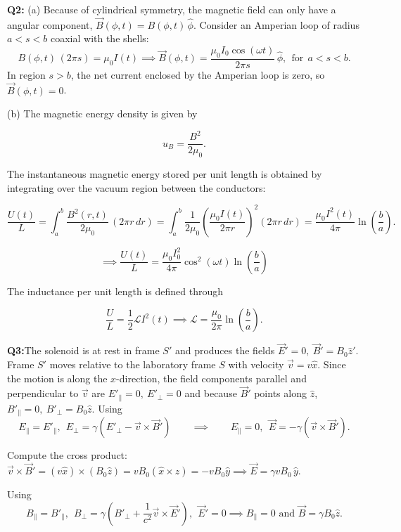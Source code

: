 \documentclass[a4paper,12pt]{article}
\begin{document}
\textbf{Q2:} (a) Because of cylindrical symmetry, the magnetic field can only have a angular component, $\vec B(\phi,t)=B(\phi,t)\,\hat \phi$. Consider an Amperian loop of radius \(a<s<b\) coaxial with the shells:
\[
B(\phi,t)\,(2\pi s)
=
\mu_0 I(t) \implies \boxed{\vec B(\phi,t)
=
\frac{\mu_0 I_0 \cos(\omega t)}{2\pi s}\,\hat \phi,
~~\text{for}~~a<s<b.
}
\]
In region \(s>b\), the net current enclosed by the Amperian loop is zero, so \(\vec B(\phi,t)=0\).

(b) The magnetic energy density is given by

\[
u_B=\frac{B^2}{2\mu_0}.
\]

The instantaneous magnetic energy stored per unit length is obtained by integrating over the vacuum region between the conductors:

\[
\frac{U(t)}{L}
=
\int_a^b
\frac{B^2(r,t)}{2\mu_0}\,(2\pi r\,dr)=\int_a^b
\frac{1}{2\mu_0}
\left(
\frac{\mu_0 I(t)}{2\pi r}
\right)^2
(2\pi r\,dr)=\frac{\mu_0 I^2(t)}{4\pi}
\ln\!\left(\frac{b}{a}\right)
.
\]

\[
\implies \boxed{
\frac{U(t)}{L}
=
\frac{\mu_0 I_0^2}{4\pi}
\cos^2(\omega t)
\ln\!\left(\frac{b}{a}\right)
}
\]

The inductance per unit length is defined through

\[
\frac{U}{L}
=
\frac{1}{2}\mathcal{L}I^2(t) \implies 
\boxed{
\mathcal{L}
=
\frac{\mu_0}{2\pi}
\ln\!\left(\frac{b}{a}\right)
}.
\]

\textbf{Q3:}The solenoid is at rest in frame $S'$ and produces the fields $\vec{E}'=0,~\vec{B}'=B_0\hat{z}'$. Frame $S'$ moves relative to the laboratory frame $S$ with velocity $\vec{v}=v\hat{x}$. Since the motion is along the $x$-direction, the field components parallel and perpendicular to $\vec v$ are $E'_{\parallel}=0,~E'_{\perp}=0$ and because $\vec B'$ points along $\hat z$, $B'_{\parallel}=0,~B'_{\perp}=B_0\hat z$. Using
\[
E_{\parallel}=E'_{\parallel},
~~
E_{\perp}=\gamma\left(E'_{\perp}-\vec v\times\vec B'\right) \qquad \implies \qquad E_{\parallel}=0,~~ \vec E
=
-\gamma(\vec v\times\vec B').
\]

Compute the cross product: $
\vec v\times\vec B'
=
(v\hat x)\times(B_0\hat z)
=
vB_0(\hat x\times\hat z)
=
-vB_0\hat y \implies \boxed{
\vec E
=
\gamma vB_0\,\hat y
}.
$

Using
\[
B_{\parallel}=B'_{\parallel},
~~
B_{\perp}
=
\gamma\left(
B'_{\perp}
+
\frac{1}{c^2}\vec v\times\vec E'
\right),~~\vec E'=0 \implies B_{\parallel}=0 \text{ and } \vec B
=
\gamma B_0\hat z.
\]
\end{document}
